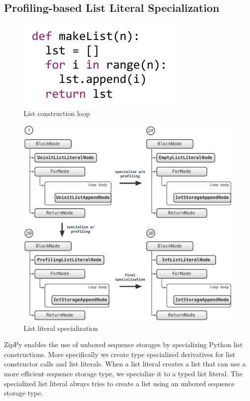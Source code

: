 \subsection{Profiling-based List Literal Specialization}

\begin{figure}[ht]
\centering
\includegraphics[scale=.9]{figures/ch3-list-construction-loop-code.pdf}
\caption{List construction loop}
\label{fig:list-construction-loop-code}
\end{figure}

\begin{figure}[t]
\centering
\includegraphics[scale=.55]{figures/ch3-empty-list-storage-profiling.pdf}
\caption{List literal specialization}
\label{fig:empty-list-storage-profiling}
\end{figure}

ZipPy enables the use of unboxed sequence storages by specializing Python list constructions.
More specifically we create type specialized derivatives for list constructor calls and list literals.
When a list literal creates a list that can use a more efficient sequence storage type, we specialize it to a typed list literal.
The specialized list literal always tries to create a list using an unboxed sequence storage type.

